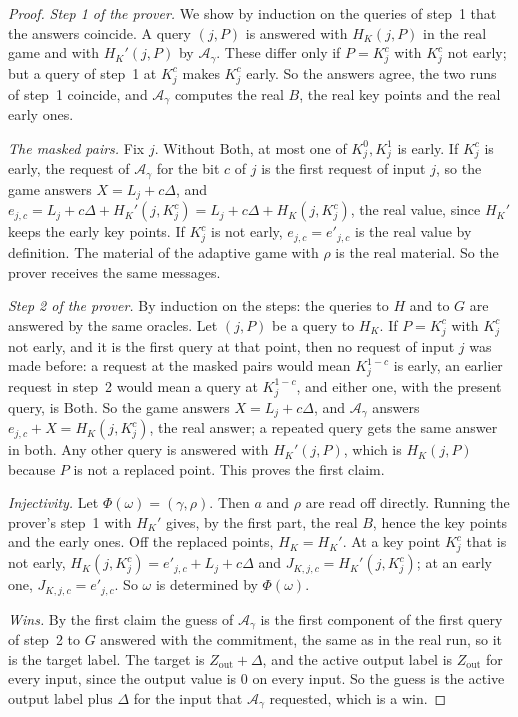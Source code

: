\begin{proof}
  \leanok
  \emph{Step 1 of the prover.} We show by induction on the queries of step~1 that the answers
  coincide. A query $(j, P)$ is answered with $H_K(j, P)$ in the real game and with $H_K'(j, P)$ by
  $\mathcal{A}_\gamma$. These differ only if $P = K^c_j$ with $K^c_j$ not early; but a query of
  step~1 at $K^c_j$ makes $K^c_j$ early. So the answers agree, the two runs of step~1 coincide, and
  $\mathcal{A}_\gamma$ computes the real $B$, the real key points and the real early ones.

  \emph{The masked pairs.} Fix $j$. Without $\mathrm{Both}$, at most one of $K^0_j, K^1_j$ is early.
  If $K^c_j$ is early, the request of $\mathcal{A}_\gamma$ for the bit $c$ of $j$ is the first
  request of input $j$, so the game answers $X = L_j + c\Delta$, and $e_{j,c} = L_j + c\Delta +
  H_K'(j, K^c_j) = L_j + c\Delta + H_K(j, K^c_j)$, the real value, since $H_K'$ keeps the early key
  points. If $K^c_j$ is not early, $e_{j,c} = e'_{j,c}$ is the real value by definition. The material
  of the adaptive game with $\rho$ is the real material. So the prover receives the same messages.

  \emph{Step 2 of the prover.} By induction on the steps: the queries to $H$ and to $G$ are answered
  by the same oracles. Let $(j, P)$ be a query to $H_K$. If $P = K^c_j$ with $K^c_j$ not early, and it
  is the first query at that point, then no request of input $j$ was made before: a request at the
  masked pairs would mean $K^{1-c}_j$ is early, an earlier request in step~2 would mean a query at
  $K^{1-c}_j$, and either one, with the present query, is $\mathrm{Both}$. So the game answers $X =
  L_j + c\Delta$, and $\mathcal{A}_\gamma$ answers $e_{j,c} + X = H_K(j, K^c_j)$, the real answer; a
  repeated query gets the same answer in both. Any other query is answered with $H_K'(j, P)$, which
  is $H_K(j, P)$ because $P$ is not a replaced point. This proves the first claim.

  \emph{Injectivity.} Let $\Phi(\omega) = (\gamma, \rho)$. Then $a$ and $\rho$ are read off
  directly. Running the prover's step~1 with $H_K'$ gives, by the first part, the real $B$, hence the
  key points and the early ones. Off the replaced points, $H_K = H_K'$. At a key point $K^c_j$ that is
  not early, $H_K(j, K^c_j) = e'_{j,c} + L_j + c\Delta$ and $J_{K,j,c} = H_K'(j, K^c_j)$; at an early
  one, $J_{K,j,c} = e'_{j,c}$. So $\omega$ is determined by $\Phi(\omega)$.

  \emph{Wins.} By the first claim the guess of $\mathcal{A}_\gamma$ is the first component of the
  first query of step~2 to $G$ answered with the commitment, the same as in the real run, so it is
  the target label. The target is $Z_{\mathrm{out}} + \Delta$, and the active output label is
  $Z_{\mathrm{out}}$ for every input, since the output value is $0$ on every input. So the guess is
  the active output label plus $\Delta$ for the input that $\mathcal{A}_\gamma$ requested, which is
  a win.
\end{proof}

